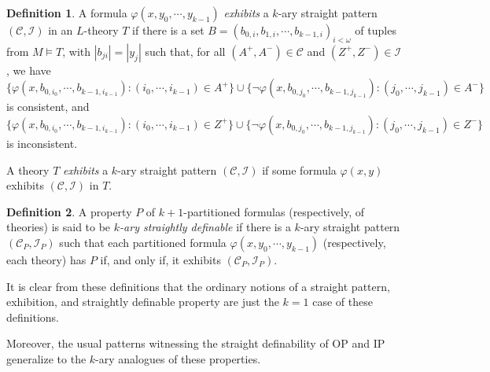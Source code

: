 \documentclass{article}
\newcommand{\calC}{\mathcal{C}}
\newcommand{\calI}{\mathcal{I}}
\newcommand{\vphi}{\varphi}
\theoremstyle{definition}
\newtheorem{definition}{Definition}
\theoremstyle{definition}
\theoremstyle{definition}
\begin{document}
\begin{definition}\label{k-ary exhibits definition}
    A formula $\vphi(x,y_0,\dotsm, y_{k-1})$ \textit{exhibits} a $k$-ary straight pattern $(\calC,\calI)$ in an $L$-theory $T$ if there is a set $B=(b_{0,i},b_{1,i},\dotsm, b_{k-1,i})_{i<\omega}$ of tuples from $M\models T$, with $|b_{ji}|=|y_j|$ such that, for all $(A^+,A^-)\in \calC$ and $(Z^+,Z^-)\in \calI$, we have \[\{\vphi(x,b_{0,i_0},\dotsm, b_{k-1,i_{k-1}})\colon (i_0,\dotsm, i_{k-1})\in A^+\}\cup \{\neg\vphi(x,b_{0,j_0},\dotsm, b_{k-1,j_{k-1}})\colon (j_0,\dotsm, j_{k-1})\in A^-\}\] is consistent, and \[\{\vphi(x,b_{0,i_0},\dotsm, b_{k-1,i_{k-1}})\colon (i_0,\dotsm, i_{k-1})\in Z^+\}\cup \{\neg\vphi(x,b_{0,j_0},\dotsm, b_{k-1,j_{k-1}})\colon (j_0,\dotsm, j_{k-1})\in Z^-\}\] is inconsistent.

     A theory $T$ \textit{exhibits} a $k$-ary straight pattern $(\mathcal{C}, \mathcal{I})$ if some formula $\varphi(x, y)$ exhibits $(\mathcal{C}, \mathcal{I})$ in $T$.
\end{definition}

\begin{definition}\label{k-ary straightly definable property}
    A property $P$ of $k+1$-partitioned formulas (respectively, of theories) is said to be \textit{$k$-ary straightly definable} if there is a $k$-ary straight pattern $(\calC_P,\calI_P)$ such that each partitioned formula $\vphi(x,y_0,\dotsm, y_{k-1})$ (respectively, each theory) has $P$ if, and only if, %
    it exhibits $(\calC_P,\calI_P)$.
\end{definition}

It is clear from these definitions that the ordinary notions of a straight pattern, exhibition, and straightly definable property are just the $k=1$ case of these definitions. 

Moreover, the usual patterns witnessing the straight definability of OP and IP generalize to the $k$-ary analogues of these properties.
\end{document}
